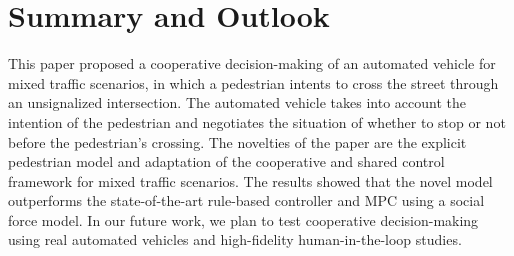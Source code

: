 \documentclass[conference]{IEEEtran}
\begin{document}
	
	\vspace*{-0.75mm}
	\section{Summary and Outlook} \label{sec:Summary}
	\vspace*{-0.5mm}
	This paper proposed a cooperative decision-making of an automated vehicle for mixed traffic scenarios, in which a pedestrian intents to cross the street through an unsignalized intersection. The automated vehicle takes into account the intention of the pedestrian and negotiates the situation of whether to stop or not before the pedestrian's crossing. The novelties of the paper are the explicit pedestrian model and adaptation of the cooperative and shared control framework for mixed traffic scenarios. The results showed that the novel model outperforms the state-of-the-art rule-based controller and MPC using a social force model. 
	In our future work, we plan to test cooperative decision-making using real automated vehicles and high-fidelity human-in-the-loop studies.
	
	
	\vspace*{-0.75mm}
	
	
	
	
	
\end{document}

